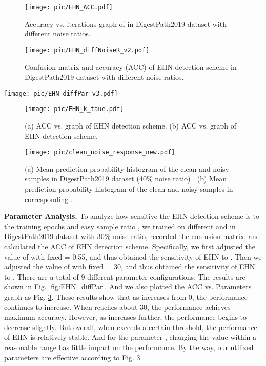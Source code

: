 \begin{figure}[]
  \centering
  \texttt{[image: pic/EHN\_ACC.pdf]}
\caption{{Accuracy vs. iterations graph of  in DigestPath2019 dataset with different noise ratios.}}
  \label{fig:ehn_acc}
\end{figure}

\begin{figure}[]
  \centering
  \texttt{[image: pic/EHN\_diffNoiseR\_v2.pdf]}
\caption{{Confusion matrix and accuracy (ACC) of EHN detection scheme in DigestPath2019 dataset with different noise ratios.}}
  \label{fig:EHN_diffNoiseR}
\end{figure}



\begin{figure*}[]
  \centering
  \texttt{[image: pic/EHN\_diffPar\_v3.pdf]}
\caption{{Confusion matrix and accuracy (ACC) of EHN detection scheme on different ``{}'' and ``'' in DigestPath2019 dataset with 30\% noise ratio.}}
  \label{fig:EHN_diffPar}
\end{figure*}

\begin{figure}[]
  \centering
  \texttt{[image: pic/EHN\_k\_taue.pdf]}
\caption{{(a) ACC vs. {} graph of EHN detection scheme. (b) ACC vs.  graph of EHN detection scheme.}}
  \label{fig:EHN_n}
\end{figure}

\begin{figure}[]
  \centering
  \texttt{[image: pic/clean\_noise\_response\_new.pdf]}
\caption{{(a) Mean prediction probability histogram of the clean and noisy samples in DigestPath2019 dataset (40\% noise ratio) . (b) Mean prediction probability histogram of the clean and noisy samples in corresponding . }}
  \label{fig:clean_noise}
\end{figure}

\textbf{{Parameter Analysis.}} {To analyze how sensitive the EHN detection scheme is to the training epochs {} and easy sample ratio , we trained on different {} and  in DigestPath2019 dataset with 30\% noise ratio, recorded the confusion matrix, and calculated the ACC of EHN detection scheme. Specifically, we first adjusted the value of {} with fixed  = 0.55, and thus obtained the sensitivity of EHN to {}. Then we adjusted the value of  with fixed {} = 30, and thus obtained the sensitivity of EHN to . There are a total of 9 different parameter configurations. The results are shown in Fig. \ref{fig:EHN_diffPar}. And we also plotted the ACC vs. Parameters graph as Fig. \ref{fig:EHN_n}. These results show that as {} increases from 0, the performance continues to increase. When {} reaches about 30, the performance achieves maximum accuracy. However, as {} increases further, the performance begins to decrease slightly. But overall, when {} exceeds a certain threshold, the performance of EHN is relatively stable. And for the parameter , changing the value within a reasonable range has little impact on the performance. By the way, our utilized parameters are effective according to Fig. \ref{fig:EHN_n}.}



